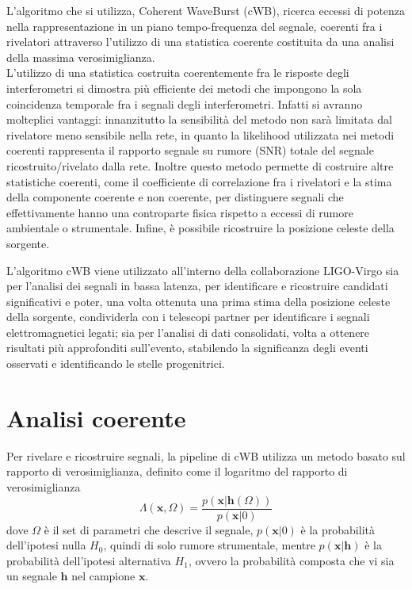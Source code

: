 L'algoritmo che si utilizza, Coherent WaveBurst (cWB), ricerca eccessi di potenza nella rappresentazione in un piano tempo-frequenza del segnale, coerenti fra i rivelatori attraverso l'utilizzo di una statistica coerente costituita da una analisi della massima verosimiglianza.\\
L'utilizzo di una statistica costruita coerentemente fra le risposte degli interferometri si dimostra più efficiente dei metodi che impongono la sola coincidenza temporale fra i segnali degli interferometri. Infatti si avranno molteplici vantaggi: innanzitutto la sensibilità del metodo non sarà limitata dal rivelatore meno sensibile nella rete, in quanto la likelihood utilizzata nei metodi coerenti rappresenta il rapporto segnale su rumore (SNR) totale del segnale ricostruito/rivelato dalla rete. 
Inoltre questo metodo permette di costruire altre statistiche coerenti, come il coefficiente di correlazione fra i rivelatori e la stima della componente coerente e non coerente, per distinguere segnali che effettivamente hanno una controparte fisica rispetto a eccessi di rumore ambientale o strumentale. Infine, è possibile ricostruire la posizione celeste della sorgente\cite{Klimenko_2008}.

L'algoritmo cWB viene utilizzato all'interno della collaborazione LIGO-Virgo sia per l'analisi dei segnali in bassa latenza, per identificare e ricostruire candidati significativi e poter, una volta ottenuta una prima stima della posizione celeste della sorgente, condividerla con i telescopi partner per identificare i segnali elettromagnetici legati; sia per l'analisi di dati consolidati, volta a ottenere risultati più approfonditi sull'evento, stabilendo la significanza degli eventi osservati e identificando le stelle progenitrici\cite{Klimenko_2016}.
\section{Analisi coerente}
\label{section:coherent_analysis}
Per rivelare e ricostruire segnali, la pipeline di cWB utilizza un metodo basato sul rapporto di verosimiglianza, definito come il logaritmo del rapporto di verosimiglianza
\begin{equation}
	\Lambda(\mathbf{x},\Omega) = \frac{p(\mathbf{x}|\mathbf{h}(\Omega))}{p(\mathbf{x}|0)}
\end{equation}
dove $\Omega$ è il set di parametri che descrive il segnale, $p(\mathbf{x}|0)$ è la probabilità dell'ipotesi nulla $H_0$, quindi di solo rumore strumentale, mentre $p(\mathbf{x}|\mathbf{h})$ è la probabilità dell'ipotesi alternativa $H_1$, ovvero la probabilità composta che vi sia un segnale $\mathbf{h}$ nel campione $\mathbf{x}$\cite{Klimenko_2016}.


